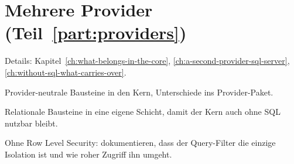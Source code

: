 \section{Mehrere Provider (Teil~\ref{part:providers})}

\noindent Details: Kapitel~\ref{ch:what-belongs-in-the-core}, \ref{ch:a-second-provider-sql-server}, \ref{ch:without-sql-what-carries-over}.

\begin{checklist}
  \item Provider-neutrale Bausteine in den Kern, Unterschiede ins Provider-Paket.
  \item Relationale Bausteine in eine eigene Schicht, damit der Kern auch ohne SQL nutzbar
    bleibt.
  \item Ohne Row Level Security: dokumentieren, dass der Query-Filter die einzige Isolation ist
    und wie roher Zugriff ihn umgeht.
\end{checklist}
